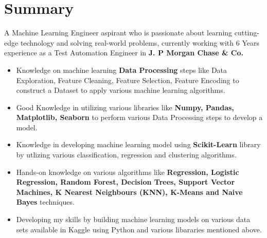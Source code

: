 \documentclass[letterpaper]{sidebarcv} %
\begin{document}
\makeprofile %


\section{Summary}

A Machine Learning Engineer aspirant who is passionate about learning cutting-edge technology and solving real-world problems, currently working with 6 Years experience as a Test Automation Engineer in \textbf{J. P Morgan Chase \& Co.} \\
\begin{twenty}
\twentyitem
{}
{}
{}
{\href{}{}}
{}
{\begin{itemize}
\item Knowledge on machine learning \textbf{Data Processing} steps like Data Exploration, Feature Cleaning, Feature Selection, Feature Encoding to construct a Dataset to apply various machine learning algorithms.
\item Good Knowledge in utilizing various libraries like \textbf{Numpy, Pandas, Matplotlib, Seaborn} to perform various Data Processing steps to develop a model.
\item Knowledge in developing machine learning model using \textbf{Scikit-Learn} library by utlizing various classification, regression and clustering algorithms.
\item Hands-on knowledge on various algorithms like \textbf{Regression, Logistic Regression, Random Forest, Decision Trees, Support Vector Machines, K Nearest Neighbours (KNN), K-Means and Naive Bayes} techniques.
\item Developing my skills by building machine learning models on various data sets available in Kaggle using Python and various libararies mentioned above. 
\end{itemize}}
\\
\end{twenty}


\end{document}
